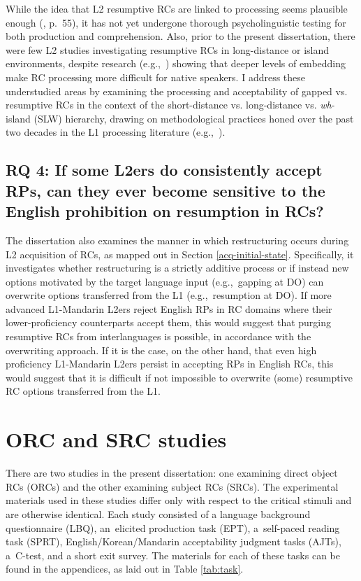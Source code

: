 While the idea that L2 resumptive RCs are linked to processing seems plausible enough (\cite{hyltenstam1984}, p.~55), it has not yet undergone thorough psycholinguistic testing for both production and comprehension. Also, prior to the present dissertation, there were few L2 studies investigating resumptive RCs in long-distance or island environments, despite research (e.g.,~\cite{morgan.wagers2018}) showing that deeper levels of embedding make RC processing more difficult for native speakers. I address these understudied areas by examining the processing and acceptability of gapped vs. resumptive RCs in the context of the short-distance vs. long-distance vs. \textit{wh}-island (SLW) hierarchy, drawing on methodological practices honed over the past two decades in the L1 processing literature (e.g.,~\cite{ferreira.swets2005,hammerly2022,hofmeister.norcliffe2013,morgan.etal2020,morgan.wagers2018}).

\subsection{RQ 4: If some L2ers do consistently accept RPs, can they ever become sensitive to the English prohibition on resumption in RCs?}

The dissertation also examines the manner in which restructuring occurs during L2 acquisition of RCs, as mapped out in Section \ref{acq-initial-state}. Specifically, it investigates whether restructuring is a strictly additive process or if instead new options motivated by the target language input (e.g.,~gapping at DO) can overwrite options transferred from the L1 (e.g.,~resumption at DO). If more advanced L1-Mandarin L2ers reject English RPs in RC domains where their lower-proficiency counterparts accept them, this would suggest that purging resumptive RCs from interlanguages is possible, in accordance with the overwriting approach. If it is the case, on the other hand, that even high proficiency L1-Mandarin L2ers persist in accepting RPs in English RCs, this would suggest that it is difficult if not impossible to overwrite (some) resumptive RC options transferred from the L1.

\section{ORC and SRC studies}\label{stu-study}

There are two studies in the present dissertation: one examining direct object RCs (ORCs) and the other examining subject RCs (SRCs). The experimental materials used in these studies differ only with respect to the critical stimuli and are otherwise identical. Each study consisted of a language background questionnaire (LBQ), an~elicited production task (EPT), a~self-paced reading task (SPRT), English/Korean/Mandarin acceptability judgment tasks (AJTs), a~C-test, and a short exit survey. The materials for each of these tasks can be found in the appendices, as laid out in Table \ref{tab:task}.

